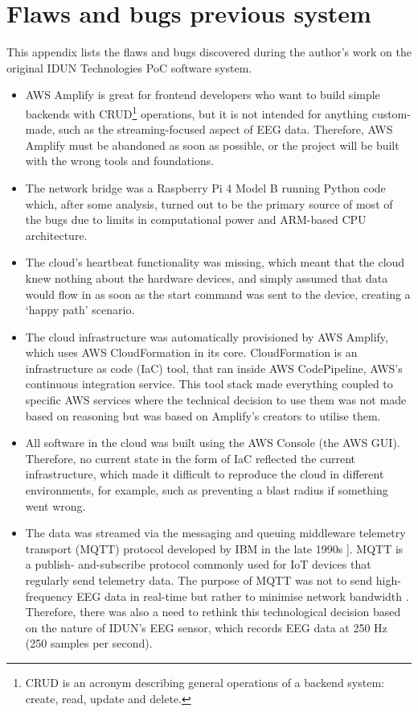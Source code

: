 \chapter{Flaws and bugs previous system}
\label{appendix2-flaws-and-bugs-previous-system}

This appendix lists the flaws and bugs discovered during the author's work on the original IDUN Technologies PoC software system.

\begin{itemize}
  \item AWS Amplify is great for frontend developers who want to build simple backends with CRUD\footnote{CRUD is an acronym describing general operations of a backend system: create, read, update and delete.} operations, but it is not intended for anything custom-made, such as the streaming-focused aspect of EEG data. Therefore, AWS Amplify must be abandoned as soon as possible, or the project will be built with the wrong tools and foundations.
  \item The network bridge was a Raspberry Pi 4 Model B running Python code which, after some analysis, turned out to be the primary source of most of the bugs due to limits in computational power and ARM-based CPU architecture.
  \item The cloud’s heartbeat functionality was missing, which meant that the cloud knew nothing about the hardware devices, and simply assumed that data would flow in as soon as the start command was sent to the device, creating a ‘happy path’ scenario.
  \item The cloud infrastructure was automatically provisioned by AWS Amplify, which uses AWS CloudFormation in its core. CloudFormation is an infrastructure as code (IaC) tool, that ran inside AWS CodePipeline, AWS’s continuous integration service. This tool stack made everything coupled to specific AWS services where the technical decision to use them was not made based on reasoning but was based on Amplify’s creators to utilise them.
  \item All software in the cloud was built using the AWS Console (the AWS GUI). Therefore, no current state in the form of IaC reflected the current infrastructure, which made it difficult to reproduce the cloud in different environments, for example, such as preventing a blast radius if something went wrong.
  \item The data was streamed via the messaging and queuing middleware telemetry transport (MQTT) protocol developed by IBM in the late 1990s ]\citep{yuan_getting_2017}. MQTT is a publish- and-subscribe protocol commonly used for IoT devices that regularly send telemetry data. The purpose of MQTT was not to send high-frequency EEG data in real-time but rather to minimise network bandwidth \citep{mqtt_use_nodate}. Therefore, there was also a need to rethink this technological decision based on the nature of IDUN's EEG sensor, which records EEG data at 250 Hz (250 samples per second).

\end{itemize}
